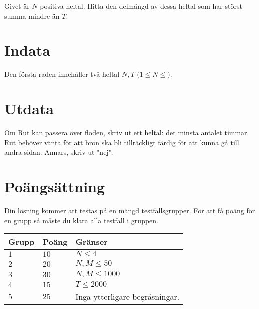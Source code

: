 Givet är $N$ positiva heltal. Hitta den delmängd av dessa heltal som har störst summa mindre än $T$. 


\section*{Indata}
Den första raden innehåller två heltal $N, T$ ($1 \leq N \leq $).
\section*{Utdata}
Om Rut kan passera över floden, skriv ut ett heltal: det minsta antalet timmar Rut behöver vänta för att bron ska bli tillräckligt färdig för att kunna gå till andra sidan. Annars, skriv ut "nej".

\section*{Poängsättning}
Din lösning kommer att testas på en mängd testfallsgrupper.
För att få poäng för en grupp så måste du klara alla testfall i gruppen.

\noindent
\begin{tabular}{| l | l | p{12cm} |}
  \hline
  \textbf{Grupp} & \textbf{Poäng} & \textbf{Gränser} \\ \hline
  $1$    & $10$      & $N \le 4$ \\ \hline
  $2$    & $20$      & $N, M \le 50$ \\ \hline
  $3$    & $30$      & $N, M \le 1000$ \\ \hline
  $4$    & $15$      & $T \le 2000$ \\ \hline
  $5$    & $25$      & Inga ytterligare begräsningar. \\ \hline
\end{tabular}
